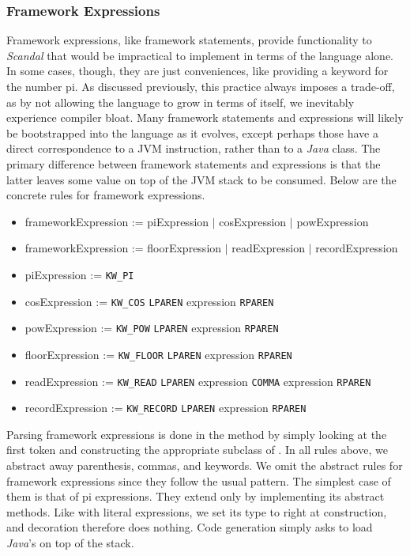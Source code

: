 \subsubsection{Framework Expressions}

Framework expressions, like framework statements, provide functionality to \emph{Scandal} that would be impractical to implement in terms of the language alone. In some cases, though, they are just conveniences, like providing a keyword for the number pi. As discussed previously, this practice always imposes a trade-off, as by not allowing the language to grow in terms of itself, we inevitably experience compiler bloat. Many framework statements and expressions will likely be bootstrapped into the language as it evolves, except perhaps those have a direct correspondence to a JVM instruction, rather than to a \emph{Java} class. The primary difference between framework statements and expressions is that the latter leaves some value on top of the JVM stack to be consumed. Below are the concrete rules for framework expressions.

\begin{itemize}
	\item frameworkExpression := piExpression $|$ cosExpression $|$ powExpression
	\item frameworkExpression := floorExpression $|$ readExpression $|$ recordExpression
	\item piExpression := \texttt{KW\_PI}
	\item cosExpression := \texttt{KW\_COS} \texttt{LPAREN} expression \texttt{RPAREN}
	\item powExpression := \texttt{KW\_POW} \texttt{LPAREN} expression \texttt{RPAREN}
	\item floorExpression := \texttt{KW\_FLOOR} \texttt{LPAREN} expression \texttt{RPAREN}
	\item readExpression := \texttt{KW\_READ} \texttt{LPAREN} expression \texttt{COMMA} expression \texttt{RPAREN}
	\item recordExpression := \texttt{KW\_RECORD} \texttt{LPAREN} expression \texttt{RPAREN}
\end{itemize}

Parsing framework expressions is done in the  method by simply looking at the first token and constructing the appropriate subclass of . In all rules above, we abstract away parenthesis, commas, and keywords. We omit the abstract rules for framework expressions since they follow the usual pattern. The simplest case of them is that of pi expressions. They extend  only by implementing its abstract methods. Like with literal expressions, we set its type to  right at construction, and decoration therefore does nothing. Code generation simply asks  to load \emph{Java}'s  on top of the stack.

